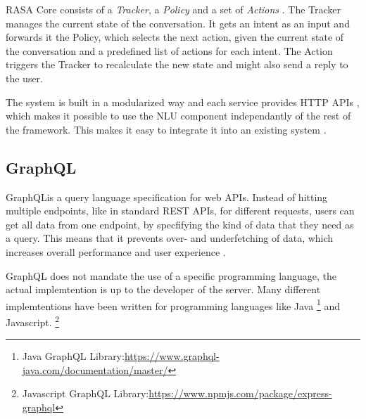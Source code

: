 
RASA Core consists of a \emph{Tracker}, a \emph{Policy} and a set of \emph{Actions} \cite{BFPN17}. The Tracker manages the current state of the conversation. It gets an intent as an input and forwards it the Policy, which selects the next action, given the current state of the conversation and a predefined list of actions for each intent. The Action triggers the Tracker to recalculate the new state and might also send a reply to the user.

The system is built in a modularized way and each service provides HTTP APIs \cite{BFPN17}, which makes it possible to use the NLU component independantly of the rest of the framework. This makes it easy to integrate it into an existing system \cite{RaKe19}.




\subsection{GraphQL}
GraphQL\footnotemark is a query language specification for web APIs.
Instead of hitting multiple endpoints, like in standard REST APIs, for different requests, users can get all data from one endpoint, by specfifying the kind of data that they need as a query. This means that it prevents over- and underfetching of data\footnotemark, which increases overall performance and user experience \cite{KKK20}.


GraphQL does not mandate the use of a specific programming language, the actual implemtention is up to the developer of the server. \footnotemark
{}
Many different implemtentions have been written for programming languages like Java \footnote{Java GraphQL Library:\href{https://www.graphql-java.com/documentation/master/}{https://www.graphql-java.com/documentation/master/}} and Javascript. \footnote{Javascript GraphQL Library:\href{https://www.npmjs.com/package/express-graphql}{https://www.npmjs.com/package/express-graphql}}

